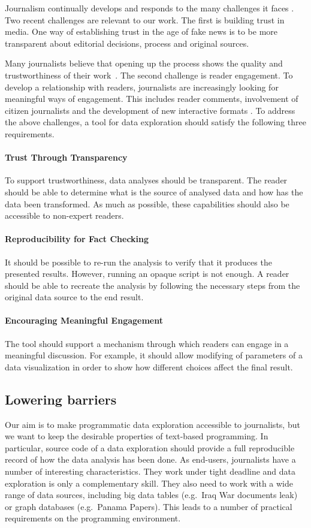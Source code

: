 \documentclass[manuscript,review,anonymous]{acmart}
\begin{document}
Journalism continually develops and responds to the many challenges it faces \cite{future}.
Two recent challenges are relevant to our work. The first is building trust in media.
One way of establishing trust in the age of fake news is to be more transparent about editorial
decisions, process and original sources.

Many journalists believe that opening up the process
shows the quality and trustworthiness of their work~\cite{transparency}.
The second challenge is reader engagement. To develop a relationship with readers, journalists are
increasingly looking for meaningful ways of engagement. This includes reader comments, involvement
of citizen journalists \cite{comments,citizen} and the development of new interactive formats
\cite{youdraw}. To address the above challenges, a tool for data exploration should satisfy the
following three requirements.

\paragraph{Trust Through Transparency}
To support trustworthiness, data analyses should be transparent. The reader should be able to
determine what is the source of analysed data and how has the data been transformed. As much as
possible, these capabilities should also be accessible to non-expert readers.

\paragraph{Reproducibility for Fact Checking}
It should be possible to re-run the analysis to verify that it produces the presented results.
However, running an opaque script is not enough. A reader should be able to recreate the analysis
by following the necessary steps from the original data source to the end result.

\paragraph{Encouraging Meaningful Engagement}
The tool should support a mechanism through which readers can engage in a meaningful discussion.
For example, it should allow modifying of parameters of a data visualization in order to show
how different choices affect the final result.

\subsection{Lowering barriers}
Our aim is to make programmatic data exploration accessible to journalists, but we want to keep
the desirable properties of text-based programming. In particular, source code of a data
exploration should provide a full reproducible record of how the data analysis has been done.
As end-users, journalists have a number of interesting characteristics. They work under tight
deadline and data exploration is only a complementary skill. They also need to work with a wide
range of data sources, including big data tables (e.g.~Iraq War documents leak) or graph
databases (e.g.~Panama Papers). This leads to a number of practical requirements on the programming
environment.
\end{document}
